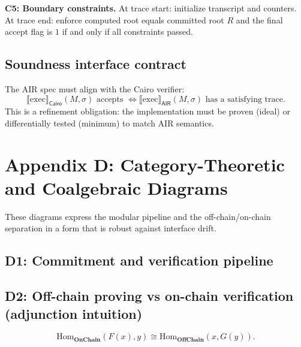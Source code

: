 \documentclass[conference]{IEEEtran}
\theoremstyle{definition}
\theoremstyle{plain}
\theoremstyle{remark}
\newcommand{\Exec}{\llbracket \mathrm{exec}\rrbracket}
\begin{document}
\textbf{C5: Boundary constraints.}
At trace start: initialize transcript and counters.
At trace end: enforce computed root equals committed root $R$ and the final accept flag is $1$ if and only if all constraints passed.

\subsection*{Soundness interface contract}
The AIR spec must align with the Cairo verifier:
\[
\Exec_{\textsf{Cairo}}(M,\sigma)\text{ accepts } \iff
\Exec_{\textsf{AIR}}(M,\sigma)\text{ has a satisfying trace.}
\]
This is a refinement obligation: the implementation must be proven (ideal) or differentially tested (minimum) to match AIR semantics.

\section{Appendix D: Category-Theoretic and Coalgebraic Diagrams}
\label{sec:categorical}
\label{app:cat}
These diagrams express the modular pipeline and the off-chain/on-chain separation in a form that is robust against interface drift.

\subsection*{D1: Commitment and verification pipeline}
\begin{center}
\end{center}

\subsection*{D2: Off-chain proving vs on-chain verification (adjunction intuition)}
\begin{center}
\end{center}

\[
\mathrm{Hom}_{\mathbf{OnChain}}(F(x), y)\cong \mathrm{Hom}_{\mathbf{OffChain}}(x, G(y)).
\]
\end{document}
